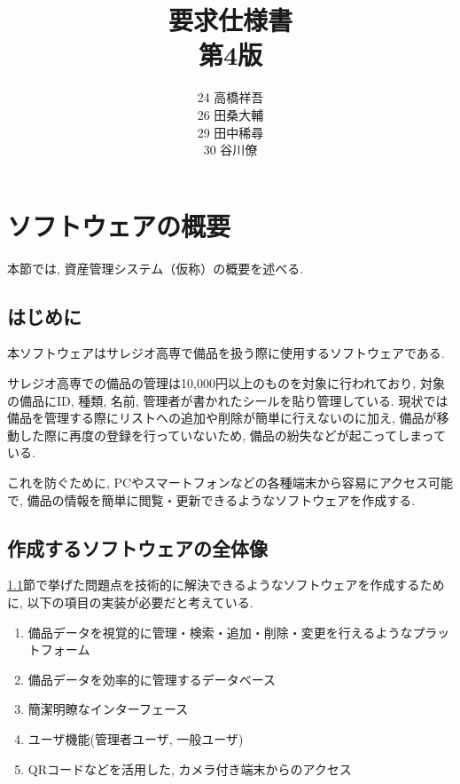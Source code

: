 \documentclass[11ptm]{jsarticle}
\title{{\Huge 要求仕様書}\\第4版}
\author{24 高橋祥吾\\26 田桑大輔\\29 田中稀尋\\30 谷川僚}
\date{}
\begin{document}
\setcounter{page}{0}

\maketitle
\thispagestyle{empty}

\clearpage

\setcounter{page}{0}
\thispagestyle{empty}

\tableofcontents
\clearpage


\section{ソフトウェアの概要}
\label{sec:ソフトウェアの概要}
本節では, 資産管理システム（仮称）の概要を述べる.

\subsection{はじめに}
\label{subsec:はじめに}
本ソフトウェアはサレジオ高専で備品を扱う際に使用するソフトウェアである. \par
サレジオ高専での備品の管理は10,000円以上のものを対象に行われており, 対象の備品にID, 種類, 名前, 管理者が書かれたシールを貼り管理している. 現状では備品を管理する際にリストへの追加や削除が簡単に行えないのに加え, 備品が移動した際に再度の登録を行っていないため, 備品の紛失などが起こってしまっている.\par
これを防ぐために, PCやスマートフォンなどの各種端末から容易にアクセス可能で, 備品の情報を簡単に閲覧・更新できるようなソフトウェアを作成する.

\subsection{作成するソフトウェアの全体像}
\label{subsec:作成するソフトウェアの全体像}
\ref{subsec:はじめに}節で挙げた問題点を技術的に解決できるようなソフトウェアを作成するために, 以下の項目の実装が必要だと考えている.
\begin{enumerate}
  \item 備品データを視覚的に管理・検索・追加・削除・変更を行えるようなプラットフォーム
  \item 備品データを効率的に管理するデータベース
  \item 簡潔明瞭なインターフェース
  \item ユーザ機能(管理者ユーザ, 一般ユーザ)
  \item QRコードなどを活用した, カメラ付き端末からのアクセス
\end{enumerate}
\end{document}
